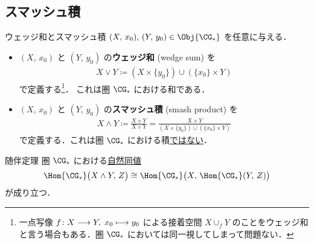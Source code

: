 \documentclass[algtopo_main]{subfiles}
\begin{document}
\subsection{スマッシュ積}

\begin{mydef}[label=def:wedge-smash]{ウェッジ和とスマッシュ積}
    $(X,\, x_0),\, (Y,\, y_0) \in \Obj{\CG_*}$ を任意に与える．
    \begin{itemize}
        \item $(X,\, x_0)$ と $(Y,\, y_0)$ の\textbf{ウェッジ和} (wedge sum) を
        \begin{align}
            X \vee Y \coloneqq (X \times \{y_0\}) \cup (\{x_0\} \times Y)
        \end{align}
        で定義する\footnote{一点写像 $f \colon X \longrightarrow Y,\; x_0 \longmapsto y_0$ による接着空間 $X \cup_f Y$ のことをウェッジ和と言う場合もある．圏 $\CG_*$ においては同一視してしまって問題ない．}．
        これは圏 $\CG_*$ における和である．
        \item $(X,\, x_0)$ と $(Y,\, y_0)$ の\textbf{スマッシュ積} (smash product) を
        \begin{align}
            X \wedge Y \coloneqq \frac{X \times Y}{X \vee Y} = \frac{X\times Y}{(X \times \{y_0\}) \cup (\{x_0\} \times Y)}
        \end{align}
        で定義する．これは圏 $\CG_*$ における積\underline{ではない}．
    \end{itemize}
\end{mydef}

\begin{myprop}[label=prop:adjoint-b]{随伴定理}
    圏 $\CG_*$ における\hyperref[def:natural-isomorphism]{自然同値}
    \begin{align}
        \Hom{\CG_*} \bigl(X \wedge Y,\, Z\bigr) \cong \Hom{\CG_*} \bigl( X,\, \Hom{\CG_*} (Y,\, Z) \bigr) 
    \end{align}
    が成り立つ．
\end{myprop}
\end{document}
